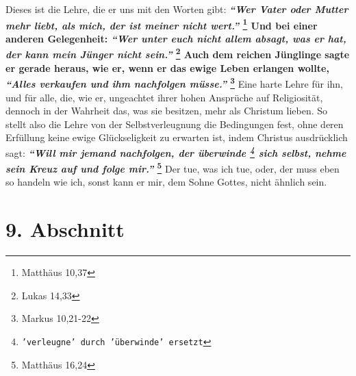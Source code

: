 Dieses ist die Lehre, die er uns mit den Worten gibt:
\textbf{
\textit{"`Wer Vater oder Mutter mehr liebt, als mich, der ist meiner nicht
wert."'}
\footnote{Matthäus  10,37}
Und bei einer anderen Gelegenheit:
\textit{"`Wer unter euch nicht allem absagt, was er hat, der kann mein Jünger
nicht sein."'}
\footnote{Lukas 14,33} Auch dem reichen
Jünglinge sagte er gerade heraus, wie er, wenn er das ewige Leben erlangen
wollte,
\textit{"`Alles verkaufen und ihm nachfolgen müsse."'}
\footnote{Markus 10,21-22}
}
Eine harte Lehre für ihn, und für alle, die, wie er, ungeachtet ihrer hohen
Ansprüche auf Religiosität, dennoch in der Wahrheit das, was sie besitzen, mehr
als Christum lieben. So stellt also die Lehre von der Selbstverleugnung die
Bedingungen fest, ohne deren Erfüllung keine ewige Glückseligkeit zu erwarten
ist, indem Christus ausdrücklich sagt:
\textbf{
\textit{"`Will mir jemand nachfolgen, der überwinde \footnote{\texttt{'verleugne'
durch 'überwinde' ersetzt}} sich selbst, nehme sein Kreuz auf und folge
mir."'}
\footnote{Matthäus 16,24}}
Der tue, was ich tue, oder, der muss eben so handeln wie ich, sonst kann
er mir, dem Sohne Gottes, nicht ähnlich sein.

\section{9. Abschnitt} \label{kap4_ab9}


